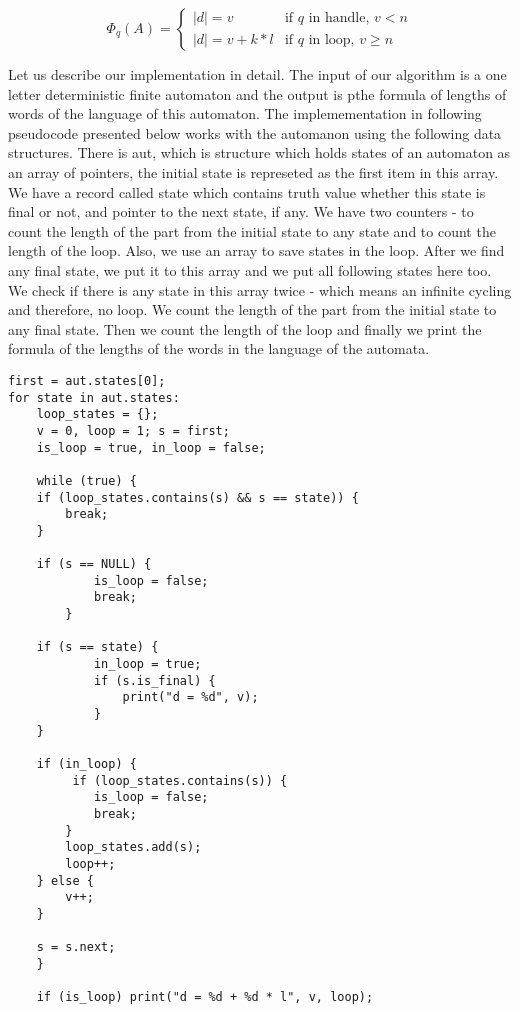 \[
  \Phi_q(A) =
  \begin{cases}
   |d| = v & \text{if $q$ in handle, $v < n$} \\
   |d| = v + k*l & \text{if $q$ in loop, $v \geq n$}
  \end{cases}
\]

Let us describe our implementation in detail. The input of our algorithm is a one letter deterministic finite automaton and the output is pthe formula of lengths of words of the language of this automaton. The implemementation in following pseudocode presented below works with the automanon using the following data structures. There is aut, which is structure which holds states of an automaton as an array of pointers, the initial state is represeted as the first item in this array. We have a record called state which contains truth value whether this state is final or not, and pointer to the next state, if any. We have two counters - to count the length of the part from the initial state to any state and to count the length of the loop. Also, we use an array to save states in the loop. After we find any final state, we put it to this array and we put all following states here too. We check if there is any state in this array twice - which means an infinite cycling and therefore, no loop. We count the length of the part from the initial state to any final state. Then we count the length of the loop and finally we print the formula of the lengths of the words in the language of the automata.

\newpage
\begin{lstlisting}
first = aut.states[0];
for state in aut.states:
    loop_states = {};
    v = 0, loop = 1; s = first;
    is_loop = true, in_loop = false;
    
    while (true) {
	if (loop_states.contains(s) && s == state)) {
	    break;
	}
	
	if (s == NULL) {
            is_loop = false;
            break;
        }
	
	if (s == state) {
            in_loop = true;
            if (s.is_final) {
                print("d = %d", v);
            }
	}
	
	if (in_loop) {
	     if (loop_states.contains(s)) {
	        is_loop = false;
	        break;
	    }
	    loop_states.add(s);
	    loop++;
	} else {
	    v++;
	}
	
	s = s.next;
    }

    if (is_loop) print("d = %d + %d * l", v, loop);
\end{lstlisting}


